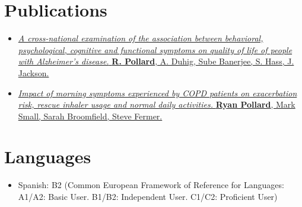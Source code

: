 \documentclass[11pt, a4paper]{awesome-cv}
\providecommand{\tightlist}{%
	\setlength{\itemsep}{0pt}\setlength{\parskip}{0pt}}
\begin{document}
\hypertarget{publications}{%
\section{Publications}\label{publications}}

\begin{itemize}
\item
  \href{https://www.researchgate.net/publication/275423120_A_cross-national_examination_of_the_association_between_behavioral_psychological_cognitive_and_functional_symptoms_on_quality_of_life_of_people_with_Alzheimer's_disease}{\emph{A
  cross-national examination of the association between behavioral,
  psychological, cognitive and functional symptoms on quality of life of
  people with Alzheimer's disease.} \textbf{R. Pollard}, A. Duhig, Sube
  Banerjee, S. Hass, J. Jackson.}
\item
  \href{https://thorax.bmj.com/content/67/Suppl_2/A155.1}{\emph{Impact
  of morning symptoms experienced by COPD patients on exacerbation risk,
  rescue inhaler usage and normal daily activities.} \textbf{Ryan
  Pollard}, Mark Small, Sarah Broomfield, Steve Fermer.}
\end{itemize}

\hypertarget{languages}{%
\section{Languages}\label{languages}}

\begin{itemize}
\tightlist
\item
  Spanish: B2 (Common European Framework of Reference for Languages:
  A1/A2: Basic User. B1/B2: Independent User. C1/C2: Proficient User)
\end{itemize}
\end{document}
